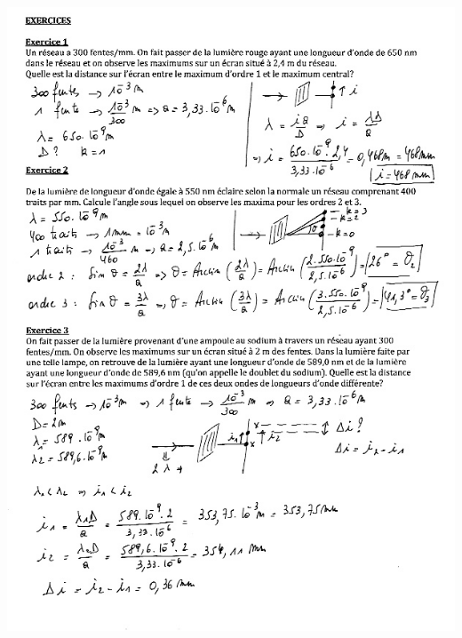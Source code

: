 \includegraphics[width=18.503cm,height=25.788cm]{Pictures/1000000100000267000003591812743A6BDA8B59.png}

